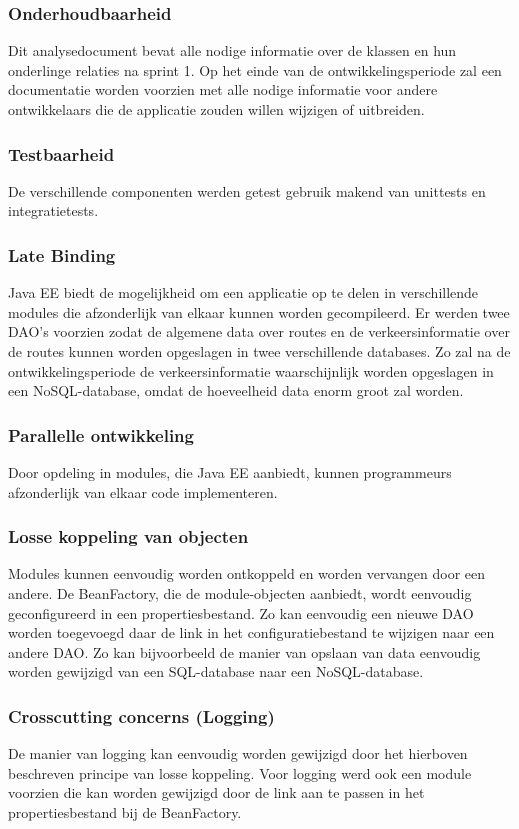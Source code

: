 \documentclass[ps,a4paper,oneside]{report}
\begin{document}
\subsubsection{Onderhoudbaarheid}
Dit analysedocument bevat alle nodige informatie over de klassen en hun onderlinge relaties na sprint 1. Op het einde van de ontwikkelingsperiode zal een documentatie worden voorzien met alle nodige informatie voor andere ontwikkelaars die de applicatie zouden willen wijzigen of uitbreiden.
\subsubsection{Testbaarheid}
De verschillende componenten werden getest gebruik makend van unittests en integratietests.
\subsubsection{Late Binding}
Java EE biedt de mogelijkheid om een applicatie op te delen in verschillende modules die afzonderlijk van elkaar kunnen worden gecompileerd. Er werden twee DAO's voorzien zodat de algemene data over routes en de verkeersinformatie over de routes kunnen worden opgeslagen in twee verschillende databases. Zo zal na de ontwikkelingsperiode de verkeersinformatie waarschijnlijk worden opgeslagen in een NoSQL-database, omdat de hoeveelheid data enorm groot zal worden. 
\subsubsection{Parallelle ontwikkeling}
Door opdeling in modules, die Java EE aanbiedt, kunnen programmeurs afzonderlijk van elkaar code implementeren.
\subsubsection{Losse koppeling van objecten}
Modules kunnen eenvoudig worden ontkoppeld en worden vervangen door een andere. De BeanFactory, die de module-objecten aanbiedt, wordt eenvoudig geconfigureerd in een propertiesbestand. Zo kan eenvoudig een nieuwe DAO worden toegevoegd daar de link in het configuratiebestand te wijzigen naar een andere DAO. Zo kan bijvoorbeeld de manier van opslaan van data eenvoudig worden gewijzigd van een SQL-database naar een NoSQL-database.
\subsubsection{Crosscutting concerns (Logging)}
De manier van logging kan eenvoudig worden gewijzigd door het hierboven beschreven principe van losse koppeling. Voor logging werd ook een module voorzien die kan worden gewijzigd door de link aan te passen in het propertiesbestand bij de BeanFactory.
\clearpage
\end{document}
